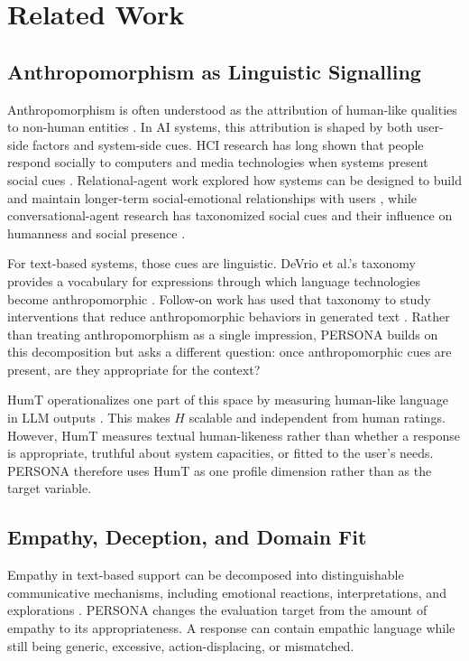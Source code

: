 \documentclass[manuscript,review,anonymous]{acmart}
\begin{document}
\section{Related Work}

\subsection{Anthropomorphism as Linguistic Signalling}

Anthropomorphism is often understood as the attribution of human-like qualities to non-human entities \cite{epley2007,waytz2010,epley2008}. In AI systems, this attribution is shaped by both user-side factors and system-side cues. HCI research has long shown that people respond socially to computers and media technologies when systems present social cues \cite{nass1994,reeves1996,nass2000}. Relational-agent work explored how systems can be designed to build and maintain longer-term social-emotional relationships with users \cite{bickmore2005}, while conversational-agent research has taxonomized social cues and their influence on humanness and social presence \cite{feine2019,araujo2018,go2019}.

For text-based systems, those cues are linguistic. DeVrio et al.'s taxonomy provides a vocabulary for expressions through which language technologies become anthropomorphic \cite{devrio2025}. Follow-on work has used that taxonomy to study interventions that reduce anthropomorphic behaviors in generated text \cite{cheng2025dehumanizing}. Rather than treating anthropomorphism as a single impression, PERSONA builds on this decomposition but asks a different question: once anthropomorphic cues are present, are they appropriate for the context?

HumT operationalizes one part of this space by measuring human-like language in LLM outputs \cite{cheng2025}. This makes $H$ scalable and independent from human ratings. However, HumT measures textual human-likeness rather than whether a response is appropriate, truthful about system capacities, or fitted to the user's needs. PERSONA therefore uses HumT as one profile dimension rather than as the target variable.

\subsection{Empathy, Deception, and Domain Fit}

Empathy in text-based support can be decomposed into distinguishable communicative mechanisms, including emotional reactions, interpretations, and explorations \cite{sharma2020}. PERSONA changes the evaluation target from the amount of empathy to its appropriateness. A response can contain empathic language while still being generic, excessive, action-displacing, or mismatched.
\end{document}
